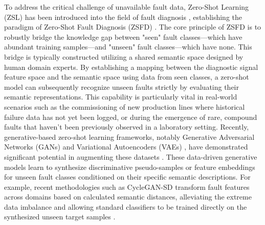 To address the critical challenge of unavailable fault data, Zero-Shot Learning (ZSL) has been introduced into the field of fault diagnosis \cite{precup2015overview}, establishing the paradigm of Zero-Shot Fault Diagnosis (ZSFD) \cite{lampert2014attribute,xian2019zero}. The core principle of ZSFD is to robustly bridge the knowledge gap between "seen" fault classes—which have abundant training samples—and "unseen" fault classes—which have none. This bridge is typically constructed utilizing a shared semantic space designed by human domain experts. By establishing a mapping between the diagnostic signal feature space and the semantic space using data from seen classes, a zero-shot model can subsequently recognize unseen faults strictly by evaluating their semantic representations. This capability is particularly vital in real-world scenarios such as the commissioning of new production lines where historical failure data has not yet been logged, or during the emergence of rare, compound faults that haven't been previously observed in a laboratory setting. Recently, generative-based zero-shot learning frameworks, notably Generative Adversarial Networks (GANs) \cite{goodfellow2014generative} and Variational Autoencoders (VAEs) \cite{lv2020hybrid}, have demonstrated significant potential in augmenting these datasets \cite{wang2020deep}. These data-driven generative models learn to synthesize discriminative pseudo-samples or feature embeddings for unseen fault classes conditioned on their specific semantic descriptions. For example, recent methodologies such as CycleGAN-SD \cite{liao2024cyclegan} transform fault features across domains based on calculated semantic distances, alleviating the extreme data imbalance and allowing standard classifiers to be trained directly on the synthesized unseen target samples \cite{wang2020deep}. 

